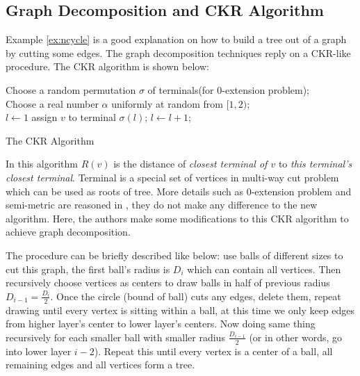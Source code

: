 \documentclass[11pt,twoside, onecolumn]{IEEEtran}
\begin{document}
\subsection{Graph Decomposition and CKR Algorithm}
\label{sec:CKR}
Example \ref{ex:ncycle} is a good explanation on how to build a tree out of a graph by cutting some edges.
The graph decomposition techniques reply on a CKR-like procedure. The CKR algorithm is shown below:
\begin{algorithm}[hbt]
\SetAlgoNoLine
  Choose a random permutation $\sigma$ of terminals(for 0-extension problem);\\
  Choose a real number $\alpha$ uniformly at random from $[1,2)$;\\
  {
  	$l \gets 1$\;
	{
		{
			assign $v$ to terminal $\sigma(l)$;
		}
		$l\gets l + 1$;
	}
   }
\caption {The CKR Algorithm}\label{alg:CKR}
\end{algorithm}
In this algorithm $R(v)$ is the distance of {\it closest terminal of $v$} to {\it this terminal's closest terminal}. 
Terminal is a special set of vertices in multi-way cut problem which can be used as roots of tree.
More details such as 0-extension problem and semi-metric are reasoned in \cite{CKR}, they do not make any difference to the new algorithm. Here, the authors make some modifications to this CKR algorithm
to achieve graph decomposition. 

The procedure can be briefly described like below: use balls of different sizes to cut this graph, the first
ball's radius is $D_i$ which can contain all vertices. Then recursively choose vertices as centers to draw
balls in half of previous radius $D_{i-1} = \frac{D_i}{2}$. Once the circle (bound of ball) cuts any edges,
delete them, repeat drawing until every vertex is sitting within a ball, at this time 
we only keep edges from higher layer's center to lower layer's centers. Now doing same thing recursively
for each smaller ball with smaller radius $\frac{D_{i-1}}{2}$ (or in other words, go into lower layer $i-2$).
 Repeat this until every vertex is a center of a ball, all remaining edges and all vertices form a tree.
 
\end{document}
